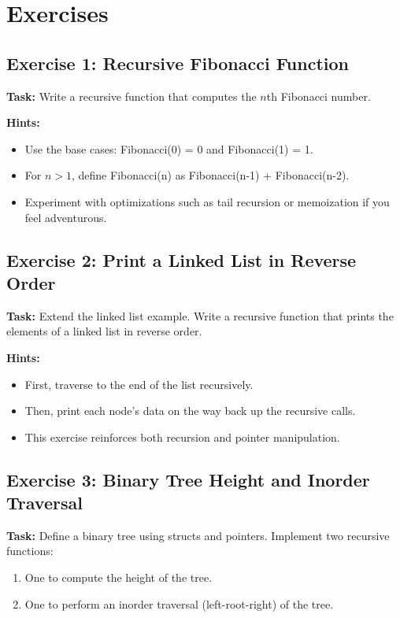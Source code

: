 \documentclass{article}
\begin{document}
\section{Exercises}

\subsection{Exercise 1: Recursive Fibonacci Function}
\textbf{Task:} Write a recursive function that computes the \( n \)th Fibonacci number.

\textbf{Hints:}
\begin{itemize}
    \item Use the base cases: Fibonacci(0) = 0 and Fibonacci(1) = 1.
    \item For \( n > 1 \), define Fibonacci(n) as Fibonacci(n-1) + Fibonacci(n-2).
    \item Experiment with optimizations such as tail recursion or memoization if you feel adventurous.
\end{itemize}

\subsection{Exercise 2: Print a Linked List in Reverse Order}
\textbf{Task:} Extend the linked list example. Write a recursive function that prints the elements of a linked list in reverse order.

\textbf{Hints:}
\begin{itemize}
    \item First, traverse to the end of the list recursively.
    \item Then, print each node’s data on the way back up the recursive calls.
    \item This exercise reinforces both recursion and pointer manipulation.
\end{itemize}

\subsection{Exercise 3: Binary Tree Height and Inorder Traversal}
\textbf{Task:} Define a binary tree using structs and pointers. Implement two recursive functions:
\begin{enumerate}
    \item One to compute the height of the tree.
    \item One to perform an inorder traversal (left-root-right) of the tree.
\end{enumerate}
\end{document}

